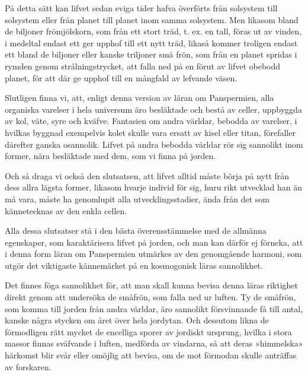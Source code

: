 \documentclass[a4paper, 12pt, oneside, swedish]{article}
\begin{document}
På detta sätt kan lifvet sedan eviga tider hafva överförts från solsystem till solsystem eller från planet till planet inom samma solsystem. Men likasom bland de biljoner frömjölskorn, som från ett stort träd, t. ex. en tall, föras ut av vinden, i medeltal endast ett ger upphof till ett nytt träd, likaså kommer troligen endast ett bland de biljoner eller kanske triljoner små frön, som från en planet spridas i rymden genom strålningstrycket, att falla ned på en förut av lifvet obebodd planet, för att där ge upphof till en mångfald av lefvande väsen.

Slutligen finna vi, att, enligt denna version av läran om Panspermien, alla organiska varelser i hela universum äro besläktade och bestå av celler, uppbyggda av kol, väte, syre och kväfve. Fantasien om andra världar, bebodda av varelser, i hvilkas byggnad exempelvis kolet skulle vara ersatt av kisel eller titan, förefaller därefter ganska osannolik. Lifvet på andra bebodda världar rör sig sannolikt inom former, nära besläktade med dem, som vi finna på jorden.

Och så draga vi också den slutsatsen, att lifvet alltid måste börja på nytt från dess allra lägsta former, likasom hvarje individ för sig, huru rikt utvecklad han än må vara, måste ha genomlupit alla utvecklingsstadier, ända från det som kännetecknas av den enkla cellen.

Alla dessa slutsatser stå i den bästa överensstämmelse med de allmänna egenskaper, som karaktärisera lifvet på jorden, och man kan därför ej förneka, att i denna form läran om Panspermien utmärkes av den genomgående harmoni, som utgör det viktigaste kännemärket på en kosmogonisk läras sannolikhet.

Det finnes föga sannolikhet för, att man skall kunna bevisa denna läras riktighet direkt genom att undersöka de småfrön, som falla ned ur luften. Ty de småfrön, som komma till jorden från andra världar, äro sannolikt försvinnande få till antal, kanske några stycken om året över hela jordytan. Och dessutom likna de förmodligen rätt mycket de encelliga sporer av jordiskt ursprung, hvilka i stora massor finnas sväfvande i luften, medförda av vindarna, så att deras »himmelska» härkomst blir svår eller omöjlig att bevisa, om de mot förmodan skulle anträffas av forskaren.
\end{document}
